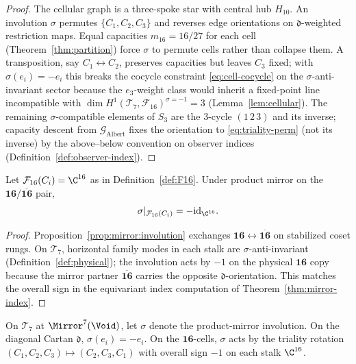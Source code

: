 \begin{proof}
The cellular graph is a three-spoke star with central hub $H_{10}$. An
involution $\sigma$ permutes $\{C_1,C_2,C_3\}$ and reverses edge orientations
on $\mathfrak{d}$-weighted restriction maps. Equal capacities
$m_{16}=16/27$ for each cell (Theorem~\ref{thm:partition}) force $\sigma$ to
permute cells rather than collapse them. A transposition, say
$C_1\leftrightarrow C_2$, preserves capacities but leaves $C_3$ fixed; with
$\sigma(e_i)=-e_i$ this breaks the cocycle constraint
\eqref{eq:cell-cocycle} on the $\sigma$-anti-invariant sector because the
$e_3$-weight class would inherit a fixed-point line incompatible with
$\dim H^1(\mathcal{T}_7,\mathcal{F}_{16})^{\sigma=-1}=3$
(Lemma~\ref{lem:cellular}). The remaining $\sigma$-compatible elements of
$S_3$ are the $3$-cycle $(1\,2\,3)$ and its inverse; capacity descent from
$\mathcal{G}_{\mathrm{Albert}}$ fixes the orientation to
\eqref{eq:triality-perm} (not its inverse) by the above--below convention on
observer indices (Definition~\ref{def:observer-index}).
\end{proof}

\begin{lemma}\label{lem:triality-sign}
Let $\mathcal{F}_{16}(C_i)=\C^{16}$ as in Definition~\ref{def:F16}. Under
product mirror on the $\mathbf{16}/\overline{\mathbf{16}}$ pair,
\begin{equation}\label{eq:triality-sign}
  \sigma|_{\mathcal{F}_{16}(C_i)}=-\mathrm{id}_{\C^{16}}.
\end{equation}
\end{lemma}

\begin{proof}
Proposition~\ref{prop:mirror:involution} exchanges
$\mathbf{16}\leftrightarrow\overline{\mathbf{16}}$ on stabilized coset rungs.
On $\mathcal{T}_7$, horizontal family modes in each stalk are
$\sigma$-anti-invariant (Definition~\ref{def:physical}); the involution acts by
$-1$ on the physical $\mathbf{16}$ copy because the mirror partner
$\overline{\mathbf{16}}$ carries the opposite $\mathfrak{d}$-orientation. This
matches the overall sign in the equivariant index computation of
Theorem~\ref{thm:mirror-index}.
\end{proof}

\begin{proposition}\label{prop:triality}
On $\mathcal{T}_7$ at $\Mirror^7(\Void)$, let $\sigma$ denote the product-mirror
involution. On the diagonal Cartan $\mathfrak{d}$,
$\sigma(e_i)=-e_i$. On the $\mathbf{16}$-cells,
$\sigma$ acts by the triality rotation $(C_1,C_2,C_3)\mapsto(C_2,C_3,C_1)$
with overall sign $-1$ on each stalk $\C^{16}$.
\end{proposition}

